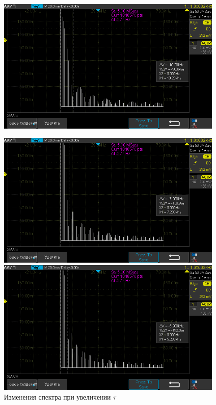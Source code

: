 \documentclass[12pt,a4paper]{article}
\begin{document}
\begin{figure}[H]
	\centering
	\begin{minipage}[b]{.33\textwidth}
		\centering
		\includegraphics[width=0.9\linewidth]{"photo/impulse5"}
		\label{photo:impulse_tau}
		\caption{Изменения спектра при увеличении $\tau$}
	\end{minipage}%
	\begin{minipage}[b]{.33\textwidth}
		\centering
		\includegraphics[width=0.9\linewidth]{"photo/impulse6"}
	\end{minipage}
	\begin{minipage}[b]{.33\textwidth}
		\centering
		\includegraphics[width=0.9\linewidth]{"photo/impulse7"}
	\end{minipage}
\end{figure}
\end{document}
